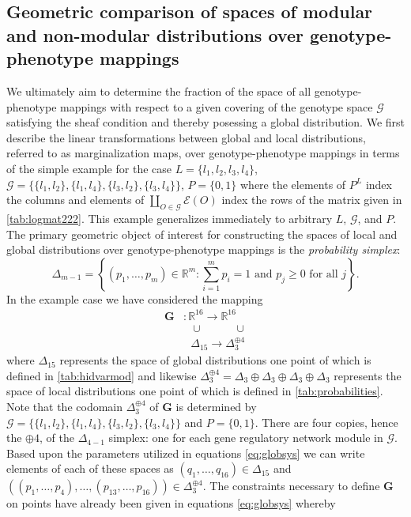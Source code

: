 \subsection{Geometric comparison of spaces of modular and non-modular distributions over genotype-phenotype mappings}\label{sec:computegeometrygpm}
We ultimately aim to determine the fraction of the space of all genotype-phenotype mappings with respect to a given covering of the genotype space $\mathcal{G}$ satisfying the sheaf condition and thereby posessing a global distribution. We first describe the linear transformations between global and local distributions, referred to as marginalization maps, over genotype-phenotype mappings in terms of the simple example for the case $L = \{ l_1,l_2,l_3,l_4 \}$, $\mathcal{G} = \{\{l_1,l_2 \},\{l_1,l_4 \},\{l_3,l_2\},\{l_3,l_4\} \}$, $P=\{0,1\}$ where the elements of $P^L$ index the columns and elements of $\coprod_{O \in \mathcal{G}} \mathcal{E} (O)$ index the rows of the matrix given in \ref{tab:logmat222}. This example generalizes immediately to arbitrary $L$, $\mathcal{G}$, and $P$. The primary geometric object of interest for constructing the spaces of local and global distributions over genotype-phenotype mappings is the \emph{probability simplex}:
$$
\Delta_{m-1} = \left\{ (p_1, \ldots , p_m) \in \mathbb{R}^m \colon \sum_{i=1}^m p_i = 1 \text{ and } p_j \geq 0 \text{ for all } j \right\}.
$$
In the example case we have considered the mapping
\begin{equation}
\begin{aligned}\label{eq:marginalmap}
\mathbf{G} &\colon \mathbb{R}^{16} \longrightarrow \mathbb{R}^{16}\\
  &\,\,\,\, \cup \,\,\,\,\,\,\,\,\,\,\,\,\,\,\,\,\, \cup\\
  &\,\,\,\, \Delta_{15} \longrightarrow \Delta_3^{\oplus 4}
\end{aligned}
\end{equation}
where $\Delta_{15}$ represents the space of global distributions one point of which is defined in \ref{tab:hidvarmod} and likewise $\Delta_3^{\oplus 4} = \Delta_3 \oplus \Delta_3 \oplus \Delta_3 \oplus \Delta_3$ represents the space of local distributions one point of which is defined in \ref{tab:probabilities}. Note that the codomain $\Delta_3^{\oplus 4}$ of $\mathbf{G}$ is determined by $\mathcal{G} = \{\{l_1,l_2 \},\{l_1,l_4 \},\{l_3,l_2\},\{l_3,l_4\} \}$ and $P=\{0,1\}$. There are four copies, hence the $\oplus 4$, of the $\Delta_{4-1}$ simplex: one for each gene regulatory network module in $\mathcal{G}$. Based upon the parameters utilized in equations \ref{eq:globsys} we can write elements of each of these spaces as $(q_1, \ldots, q_{16}) \in \Delta_{15}$ and $((p_1, \ldots , p_4), \ldots, (p_{13},\ldots,p_{16})) \in \Delta_3^{\oplus 4}$. The constraints necessary to define $\mathbf{G}$ on points have already been given in equations \ref{eq:globsys} whereby
